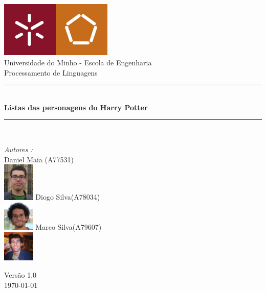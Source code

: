 \documentclass[a4paper]{article}
\begin{document}
\begin{titlepage}
\begin{center}
\includegraphics[width=0.4\textwidth]{./imagens/logo.jpg}\\[0.5cm]
\vspace{10mm}
{\huge Universidade do Minho - Escola de Engenharia}\\[0.5cm]
{\large Processamento de Linguagens}\\[0.5cm]
\vspace{10mm}
\rule{\linewidth}{0.5mm} \\[0.4cm]
{ \huge \bfseries Listas das personagens do Harry Potter \\[0.4cm] }
\rule{\linewidth}{0.5mm} \\[1.5cm]
\noindent
\begin{minipage}{0.4\textwidth}
  \begin{flushleft} \large
    \emph{Autores :}\\
    Daniel Maia \textsc{(A77531)}\\
    \includegraphics[width=1.5cm]{./imagens/daniel.jpg}\break
    Diogo Silva\textsc{(A78034)}\\
    \includegraphics[width=1.5cm]{./imagens/afonso.jpg}\break
    Marco Silva\textsc{(A79607)}\\
    \includegraphics[width=1.5cm]{./imagens/marco.jpg}\break
  \end{flushleft}
\end{minipage}%
\vfill
{\large Versão 1.0 \\ \today}
\end{center}
\end{titlepage}
\pagebreak
\tableofcontents
\end{document}
